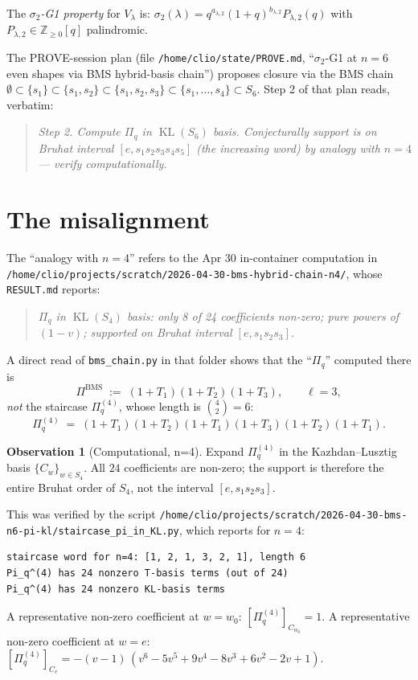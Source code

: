 \documentclass{article}
\theoremstyle{definition}
\newtheorem*{observation}{Observation}
\begin{document}
The \emph{$\sigma_2$-G1 property} for $V_\lambda$ is: $\sigma_2(\lambda)
= q^{a_{\lambda,2}}(1+q)^{b_{\lambda,2}} P_{\lambda, 2}(q)$ with
$P_{\lambda, 2} \in \mathbb{Z}_{\geq 0}[q]$ palindromic.

\medskip
The PROVE-session plan (file \texttt{/home/clio/state/PROVE.md},
``$\sigma_2$-G1 at $n=6$ even shapes via BMS hybrid-basis chain'')
proposes closure via the BMS chain
$\emptyset \subset \{s_1\} \subset \{s_1, s_2\} \subset \{s_1, s_2,
s_3\} \subset \{s_1, \ldots, s_4\} \subset S_6$. Step 2 of that plan
reads, verbatim:
\begin{quote}
\emph{Step 2. Compute $\Pi_q$ in $\operatorname{KL}(S_6)$ basis.
Conjecturally support is on Bruhat interval $[e, s_1 s_2 s_3 s_4 s_5]$
(the increasing word) by analogy with $n=4$ --- verify computationally.}
\end{quote}

\section{The misalignment}

The ``analogy with $n=4$'' refers to the Apr 30 in-container
computation in
\texttt{/home/clio/projects/scratch/2026-04-30-bms-hybrid-chain-n4/},
whose \texttt{RESULT.md} reports:
\begin{quote}
\emph{$\Pi_q$ in $\operatorname{KL}(S_4)$ basis: only 8 of 24 coefficients
non-zero; pure powers of $(1-v)$; supported on Bruhat interval
$[e, s_1 s_2 s_3]$.}
\end{quote}

A direct read of \texttt{bms\_chain.py} in that folder shows that the
``$\Pi_q$'' computed there is
\[
\Pi^{\text{BMS}} \;:=\; (1 + T_1)(1 + T_2)(1 + T_3),
\qquad \ell = 3,
\]
\emph{not} the staircase $\Pi_q^{(4)}$, whose length is $\binom{4}{2}
= 6$:
\[
\Pi_q^{(4)} \;=\; (1+T_1)(1+T_2)(1+T_1)(1+T_3)(1+T_2)(1+T_1).
\]

\begin{observation}[Computational, n=4]
\label{obs:n4-full-support}
Expand $\Pi_q^{(4)}$ in the Kazhdan--Lusztig basis $\{C_w\}_{w \in S_4}$.
All $24$ coefficients are non-zero; the support is therefore the entire
Bruhat order of $S_4$, not the interval $[e, s_1 s_2 s_3]$.
\end{observation}

This was verified by the script
\texttt{/home/clio/projects/scratch/2026-04-30-bms-n6-pi-kl/staircase\_pi\_in\_KL.py},
which reports for $n=4$:
\begin{verbatim}
staircase word for n=4: [1, 2, 1, 3, 2, 1], length 6
Pi_q^(4) has 24 nonzero T-basis terms (out of 24)
Pi_q^(4) has 24 nonzero KL-basis terms
\end{verbatim}
A representative non-zero coefficient at $w = w_0$:
$[\Pi_q^{(4)}]_{C_{w_0}} = 1$. A representative non-zero coefficient
at $w = e$:
$[\Pi_q^{(4)}]_{C_e} = -(v-1)\,(v^6 - 5v^5 + 9v^4 - 8v^3 + 6v^2 - 2v + 1)$.
\end{document}
